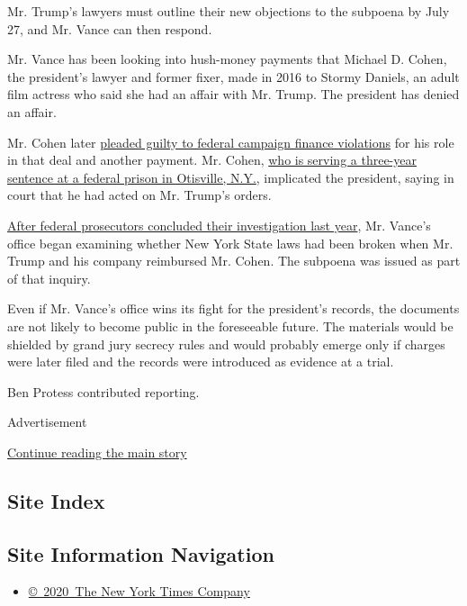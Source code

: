 Mr. Trump's lawyers must outline their new objections to the subpoena by
July 27, and Mr. Vance can then respond.

Mr. Vance has been looking into hush-money payments that Michael D.
Cohen, the president's lawyer and former fixer, made in 2016 to Stormy
Daniels, an adult film actress who said she had an affair with Mr.
Trump. The president has denied an affair.

Mr. Cohen later
\href{https://www.nytimes3xbfgragh.onion/2018/11/29/nyregion/michael-cohen-trump-russia-mueller.html}{pleaded
guilty to federal campaign finance violations} for his role in that deal
and another payment. Mr. Cohen,
\href{https://www.nytimes3xbfgragh.onion/2018/12/12/nyregion/michael-cohen-sentence-trump.html}{who
is serving a three-year sentence at a federal prison in Otisville,
N.Y.}, implicated the president, saying in court that he had acted on
Mr. Trump's orders.

\href{https://www.nytimes3xbfgragh.onion/2019/07/17/nyregion/michael-cohen-trump-investigation.html}{After
federal prosecutors concluded their investigation last year}, Mr.
Vance's office began examining whether New York State laws had been
broken when Mr. Trump and his company reimbursed Mr. Cohen. The subpoena
was issued as part of that inquiry.

Even if Mr. Vance's office wins its fight for the president's records,
the documents are not likely to become public in the foreseeable future.
The materials would be shielded by grand jury secrecy rules and would
probably emerge only if charges were later filed and the records were
introduced as evidence at a trial.

Ben Protess contributed reporting.

Advertisement

\protect\hyperlink{after-bottom}{Continue reading the main story}

\hypertarget{site-index}{%
\subsection{Site Index}\label{site-index}}

\hypertarget{site-information-navigation}{%
\subsection{Site Information
Navigation}\label{site-information-navigation}}

\begin{itemize}
\tightlist
\item
  \href{https://help.nytimes3xbfgragh.onion/hc/en-us/articles/115014792127-Copyright-notice}{©~2020~The
  New York Times Company}
\end{itemize}

